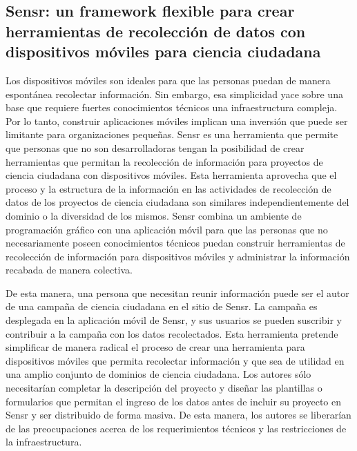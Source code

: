 \subsection{Sensr: un framework flexible para crear herramientas de recolección de datos con dispositivos móviles para ciencia ciudadana}

	Los dispositivos móviles son ideales para que las personas puedan de manera espontánea recolectar información. Sin embargo, esa simplicidad yace sobre una base que requiere fuertes conocimientos técnicos una infraestructura compleja. Por lo tanto, construir aplicaciones móviles implican una inversión que puede ser limitante para organizaciones pequeñas. Sensr es una herramienta que permite que personas que no son desarrolladoras tengan la posibilidad de crear herramientas que permitan la recolección de información para proyectos de ciencia ciudadana con dispositivos móviles. Esta herramienta aprovecha que el proceso y la estructura de la información en las actividades de recolección de datos de los proyectos de ciencia ciudadana son similares independientemente del dominio o la diversidad de los mismos. Sensr combina un ambiente de programación gráfico con una aplicación móvil para que las personas que no necesariamente poseen conocimientos técnicos puedan construir herramientas de recolección de información para dispositivos móviles y administrar la información recabada de manera colectiva.
	
	De esta manera, una persona que necesitan reunir información puede ser el autor de una campaña de ciencia ciudadana en el sitio de Sensr. La campaña es desplegada en la aplicación móvil de Sensr, y sus usuarios se pueden suscribir y contribuir a la campaña con los datos recolectados. Esta herramienta pretende simplificar de manera radical el proceso de crear una herramienta para dispositivos móviles que permita recolectar información y que sea de utilidad en una amplio conjunto de dominios de ciencia ciudadana. Los autores sólo necesitarían completar la descripción del proyecto y diseñar las plantillas o formularios que permitan el ingreso de los datos antes de incluir su proyecto en Sensr y ser distribuido de forma masiva. De esta manera, los autores se liberarían de las preocupaciones acerca de los requerimientos técnicos y las restricciones de la infraestructura.
	
